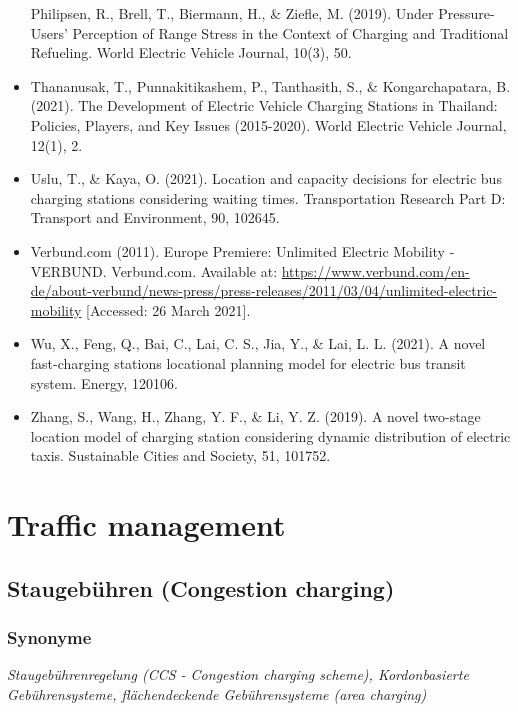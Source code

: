\documentclass[
]{book}
\begin{document}
\begin{itemize}
  Philipsen, R., Brell, T., Biermann, H., \& Ziefle, M. (2019). Under Pressure-Users' Perception of Range Stress in the Context of Charging and Traditional Refueling. World Electric Vehicle Journal, 10(3), 50.
\item
  Thananusak, T., Punnakitikashem, P., Tanthasith, S., \& Kongarchapatara, B. (2021). The Development of Electric Vehicle Charging Stations in Thailand: Policies, Players, and Key Issues (2015-2020). World Electric Vehicle Journal, 12(1), 2.
\item
  Uslu, T., \& Kaya, O. (2021). Location and capacity decisions for electric bus charging stations considering waiting times. Transportation Research Part D: Transport and Environment, 90, 102645.
\item
  Verbund.com (2011). Europe Premiere: Unlimited Electric Mobility - VERBUND. Verbund.com. Available at: \url{https://www.verbund.com/en-de/about-verbund/news-press/press-releases/2011/03/04/unlimited-electric-mobility} {[}Accessed: 26 March 2021{]}.
\item
  Wu, X., Feng, Q., Bai, C., Lai, C. S., Jia, Y., \& Lai, L. L. (2021). A novel fast-charging stations locational planning model for electric bus transit system. Energy, 120106.
\item
  Zhang, S., Wang, H., Zhang, Y. F., \& Li, Y. Z. (2019). A novel two-stage location model of charging station considering dynamic distribution of electric taxis. Sustainable Cities and Society, 51, 101752.
\end{itemize}

\hypertarget{traffic}{%
\chapter{Traffic management}\label{traffic}}

\hypertarget{congestion_charging}{%
\section{Staugebühren (Congestion charging)}\label{congestion_charging}}

\hypertarget{synonyme-8}{%
\subsection*{Synonyme}\label{synonyme-8}}

\emph{Staugebührenregelung (CCS - Congestion charging scheme), Kordonbasierte Gebührensysteme, flächendeckende Gebührensysteme (area charging)}
\end{document}
